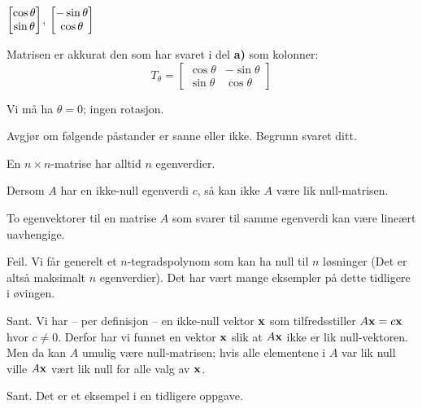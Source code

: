 \begin{losning}

\begin{punkt}
$\begin{bmatrix} \cos\theta \\ \sin\theta \end{bmatrix}$, $\begin{bmatrix} -\sin\theta \\ \cos\theta \end{bmatrix}$
\end{punkt}

\begin{punkt}
Matrisen er akkurat den som har svaret i del \textbf{a)} som kolonner:
$$T_\theta=\begin{bmatrix}
\cos\theta & -\sin\theta\\
\sin\theta & \cos\theta
\end{bmatrix}$$
\end{punkt}

\begin{punkt}
Vi må ha $\theta=0$; ingen rotasjon.
\end{punkt}

\end{losning}

\begin{oppgave}
Avgjør om følgende påstander er sanne eller ikke. Begrunn svaret ditt.

\begin{punkt}
En $n\times n$-matrise har alltid $n$ egenverdier.
\end{punkt}

\begin{punkt}
Dersom $A$ har en ikke-null egenverdi $c$, så kan ikke $A$ være lik null-matrisen.
\end{punkt}


\begin{punkt}
To egenvektorer til en matrise $A$ som svarer til samme egenverdi kan være lineært uavhengige.
\end{punkt}



\end{oppgave}

\begin{losning}

\begin{punkt}
Feil. Vi får generelt et $n$-tegradspolynom som kan ha null til $n$ løsninger (Det er altså maksimalt $n$ egenverdier). Det har vært mange eksempler på dette tidligere i øvingen.
\end{punkt}

\begin{punkt}
Sant. Vi har -- per definisjon -- en ikke-null vektor $\mathbf{x}$ som tilfredsstiller $A\mathbf{x}=c\mathbf{x}$ hvor $c\neq 0$. Derfor har vi funnet en vektor $\mathbf{x}$ slik at $A\mathbf{x}$ ikke er lik null-vektoren. Men da kan $A$ umulig være null-matrisen; hvis alle elementene i $A$ var lik null ville $A\mathbf{x}$ vært lik null for alle valg av $\mathbf{x}$.
\end{punkt}


\begin{punkt}
Sant. Det er et eksempel i en tidligere oppgave.
\end{punkt}

\end{losning}

